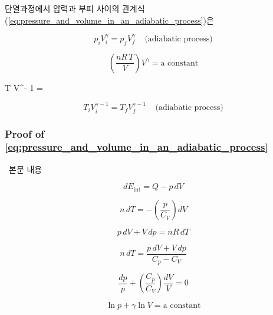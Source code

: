 단열과정에서 압력과 부피 사이의 관계식(\autoref{eq:pressure_and_volume_in_an_adiabatic_process})은


\begin{equation} p_i V_i^\gamma = p_f V_f^\gamma ~~~~~ \text{(adiabatic process)} \end{equation}

\begin{equation*} \left( \frac{nR\,T}{V} \right) V^\gamma = \text{a constant} \end{equation*}

\begin{eqbox} T V^{\gamma - 1} =  ~~~~~ 
\label{eq:temperature_and_volume_in_an_adiabatic_process} \end{eqbox}

\begin{equation} T_i V_i^{\gamma - 1} = T_f V_f^{\gamma - 1} ~~~~~ \text{(adiabatic process)} \end{equation}

\subsubsection{Proof of \autoref{eq:pressure_and_volume_in_an_adiabatic_process}}
%
\ 본문 내용


\begin{equation} dE_{\text{int}} = Q - p\,dV \end{equation}

\begin{equation} n\,dT = -\left( \frac{p}{C_V} \right) dV \end{equation}

\begin{equation} p\,dV + V\,dp = nR\,dT \end{equation}

\begin{equation} n\,dT = \frac{p\,dV + V\,dp}{C_p - C_V} \end{equation}

\begin{equation*} \frac{dp}{p} + \left( \frac{C_p}{C_V} \right) \frac{dV}{V} = 0 \end{equation*}

\begin{equation*} \ln p + \gamma \ln V = \text{a constant} \end{equation*}

